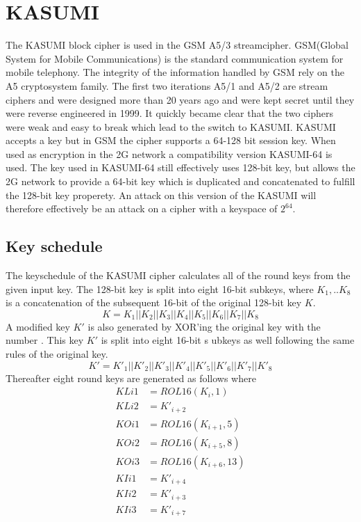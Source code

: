 \chapter{KASUMI}
\label{ch:kas}

The KASUMI block cipher is used in the GSM A5/3 streamcipher. GSM(Global System for Mobile Communications) is the standard communication system for mobile telephony. The integrity of the information handled by GSM rely on the A5 cryptosystem family. The first two iterations A5/1 and A5/2 are stream ciphers and were designed more than 20 years ago and were kept secret until they were reverse engineered in 1999\cite{A512}. It quickly became clear that the two ciphers  were weak and easy to break which lead to the switch to KASUMI. KASUMI accepts a  key but in GSM the cipher supports a 64-128 bit session key. When used as
encryption in the 2G network a compatibility version KASUMI-64 is
used. The key used in KASUMI-64 still effectively uses 128-bit key,
but allows the 2G network to provide a 64-bit key which is duplicated
and concatenated to fulfill the 128-bit key properety. An attack on
this version of the KASUMI will therefore effectively be an attack on
a cipher with a keyspace of $2^{64}$.
\section{Key schedule}
The keyschedule of the KASUMI cipher calculates all of the round keys
from the given input key. The 128-bit key is split into eight 16-bit
subkeys, where $K_1,..K_8$ is a concatenation of the subsequent 16-bit of
the original 128-bit key $K$.
\[K = K_1 || K_2 || K_3 || K_4 || K_5 || K_6 || K_7 || K_8\]
A modified key $K'$ is also generated by XOR'ing the original key with
the number . This key $K'$ is split
into eight 16-bit s
ubkeys as well following the same rules of the
original key.
\[K' = K'_1 || K'_2 || K'_3 || K'_4 || K'_5 || K'_6 || K'_7 || K'_8\]
Thereafter eight round keys are generated as follows where 
\begin{align*}
  KLi1 &= ROL16(K_i,1)\\
  KLi2 &= K'_{i+2}\\
  KOi1 &= ROL16(K_{i + 1},5)\\
  KOi2 &= ROL16(K_{i + 5},8)\\
  KOi3 &= ROL16(K_{i + 6},13)\\
  KIi1 &= K'_{i+4}\\
  KIi2 &= K'_{i+3}\\
  KIi3 &= K'_{i+7}\\
\end{align*}
